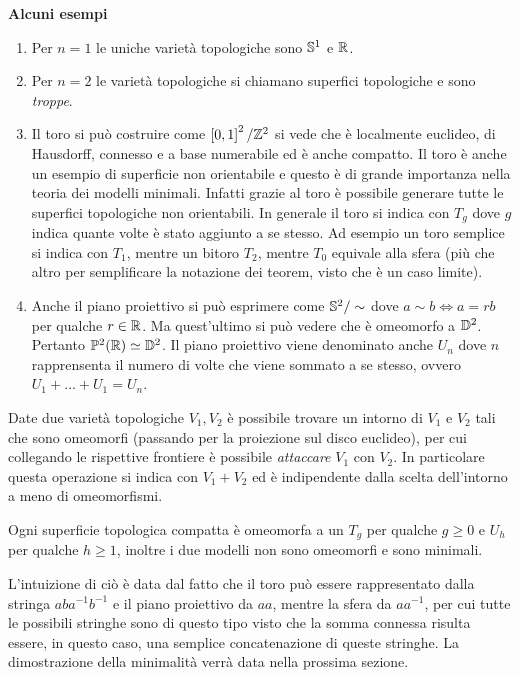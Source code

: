 \textbf{Alcuni esempi}

\begin{enumerate}
	\item Per $n=1$ le uniche varietà topologiche sono $\S^1$ e $\R$.
	\item Per $n=2$ le varietà topologiche si chiamano superfici topologiche e sono \textit{troppe}.
	\item Il toro si può costruire come $\left[0,1\right]^2/\Z^2$ si vede che è localmente euclideo, di Hausdorff, connesso e a base numerabile ed è anche compatto. Il toro è anche un esempio di superficie non orientabile e questo è di grande importanza nella teoria dei modelli minimali. Infatti grazie al toro è possibile generare tutte le superfici topologiche non orientabili. In generale il toro si indica con $T_g$ dove $g$ indica quante volte è stato aggiunto a  se stesso. Ad esempio un toro semplice si indica con $T_1$, mentre un bitoro $T_2$, mentre $T_0$ equivale alla sfera (più che altro per semplificare la notazione dei teorem, visto che è un caso limite).
	\item Anche il piano proiettivo si può esprimere come $\S^2 / \sim$ dove $a \sim b \Leftrightarrow a = rb$ per qualche $r \in \R$. Ma quest'ultimo si può vedere che è omeomorfo a $\D^2$. Pertanto $\mathbb{P}^2(\R) \simeq \D^2$. Il piano proiettivo viene denominato anche $U_n$ dove $n$ rapprensenta il numero di volte che viene sommato a se stesso, ovvero $U_1 + \dots + U_1 = U_n$.
\end{enumerate}

\begin{definition}
	Date due varietà topologiche $V_1, V_2$ è possibile trovare un intorno di $V_1$ e $V_2$ tali che sono omeomorfi (passando per la proiezione sul disco euclideo), per cui collegando le rispettive frontiere è possibile \textit{attaccare} $V_1$ con $V_2$. In particolare questa operazione si indica con $V_1 + V_2$ ed è indipendente dalla scelta dell'intorno a meno di omeomorfismi. 
\end{definition}


\begin{theorem}
	Ogni superficie topologica compatta è omeomorfa a un $T_g$ per qualche $g \ge 0$ e $U_h$ per qualche $h \ge 1$, inoltre i due modelli non sono omeomorfi e sono minimali. 
\end{theorem}

L'intuizione di ciò è data dal fatto che il toro può essere rappresentato dalla stringa $aba^{-1}b^{-1}$ e il piano proiettivo da $aa$, mentre la sfera da $aa^{-1}$, per cui tutte le possibili stringhe sono di questo tipo visto che la somma connessa risulta essere, in questo caso, una semplice concatenazione di queste stringhe. La dimostrazione della minimalità verrà data nella prossima sezione.


